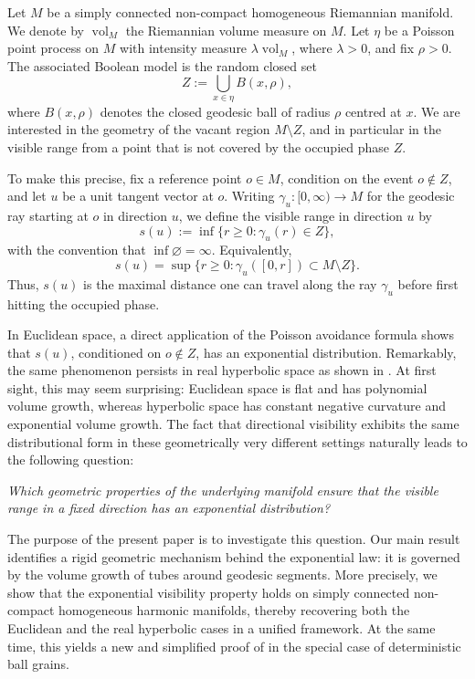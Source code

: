 \documentclass[11pt,a4paper]{article}
\theoremstyle{plain}
\theoremstyle{definition}
\theoremstyle{remark}
\newcommand{\vol}{\mathop{\mathrm{vol}}\nolimits}
\begin{document}
Let \(M\) be a simply connected non-compact homogeneous Riemannian manifold. We denote by \(\vol_M\) the Riemannian volume measure on \(M\). Let \(\eta\) be a Poisson point process on \(M\) with intensity measure \(\lambda\vol_M\), where \(\lambda>0\), and fix \(\rho>0\). The associated Boolean model is the random closed set
\[
Z:=\bigcup_{x\in\eta} B(x,\rho),
\]
where \(B(x,\rho)\) denotes the closed geodesic ball of radius \(\rho\) centred at \(x\). We are interested in the geometry of the vacant region \(M\setminus Z\), and in particular in the visible range from a point that is not covered by the occupied phase $Z$.

To make this precise, fix a reference point \(o\in M\), condition on the event \(o\notin Z\), and let \(u\) be a unit tangent vector at \(o\). Writing \(\gamma_u:[0,\infty)\to M\) for the geodesic ray starting at \(o\) in direction \(u\), we define the visible range in direction \(u\) by
\[
s(u):=\inf\{r\geq 0:\gamma_u(r)\in Z\},
\]
with the convention that $\inf\varnothing=\infty$. Equivalently,
\[
s(u)=\sup\{r\geq 0:\gamma_u([0,r])\subset M\setminus Z\}.
\]
Thus, \(s(u)\) is the maximal distance one can travel along the ray \(\gamma_u\) before first hitting the occupied phase.

In Euclidean space, a direct application of the Poisson avoidance formula shows that \(s(u)\), conditioned on \(o\notin Z\), has an exponential distribution. Remarkably, the same phenomenon persists in real hyperbolic space as shown in \cite{BuehlerHugThaeleBM}. At first sight, this may seem surprising: Euclidean space is flat and has polynomial volume growth, whereas hyperbolic space has constant negative curvature and exponential volume growth. The fact that directional visibility exhibits the same distributional form in these geometrically very different settings naturally leads to the following question:
\medskip

\noindent
\textit{Which geometric properties of the underlying manifold ensure that the
	visible range in a fixed direction has an exponential distribution?}

\medskip

The purpose of the present paper is to investigate this question. Our main result identifies a rigid geometric mechanism behind the exponential law: it is governed by the volume growth of tubes around geodesic segments. More precisely, we show that the exponential visibility property holds on simply connected non-compact homogeneous harmonic manifolds, thereby recovering both the Euclidean and the real hyperbolic cases in a unified framework. At the same time, this yields a new and simplified proof of \cite[Proposition 6.1]{BuehlerHugThaeleBM} in the special case of deterministic ball grains.
\end{document}
